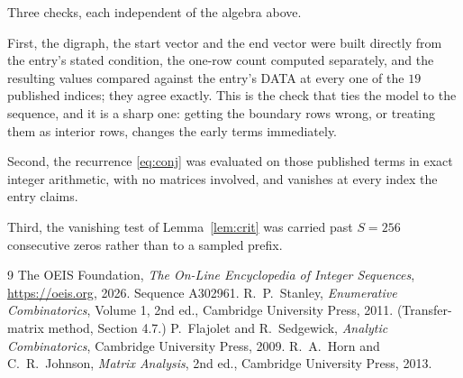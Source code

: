 \documentclass[11pt,a4paper]{article}
\theoremstyle{plain}
\theoremstyle{definition}
\begin{document}
Three checks, each independent of the algebra above.

First, the digraph, the start vector and the end vector were built directly from the
entry's stated condition, the one-row count computed separately, and the resulting values
compared against the entry's DATA at every one of the $19$ published indices; they
agree exactly. This is the check that ties the model to the sequence, and it is a sharp one:
getting the boundary rows wrong, or treating them as interior rows, changes the early terms
immediately.

Second, the recurrence \eqref{eq:conj} was evaluated on those published terms in exact
integer arithmetic, with no matrices involved, and vanishes at every index the entry claims.

Third, the vanishing test of Lemma~\ref{lem:crit} was carried past $S=256$ consecutive
zeros rather than to a sampled prefix.

\begin{thebibliography}{9}
 The OEIS Foundation, \emph{The On-Line Encyclopedia of Integer
Sequences}, \url{https://oeis.org}, 2026. Sequence A302961.
 R.~P.~Stanley, \emph{Enumerative Combinatorics}, Volume 1, 2nd ed.,
Cambridge University Press, 2011. (Transfer-matrix method, Section 4.7.)
 P.~Flajolet and R.~Sedgewick, \emph{Analytic Combinatorics}, Cambridge
University Press, 2009.
 R.~A.~Horn and C.~R.~Johnson, \emph{Matrix Analysis}, 2nd ed., Cambridge
University Press, 2013.
\end{thebibliography}
\end{document}
